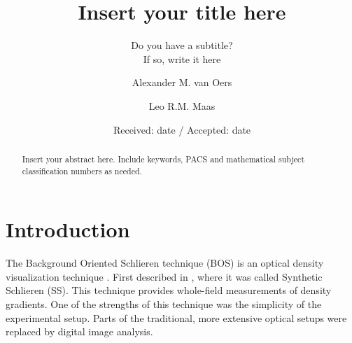 \documentclass[smallextended]{svjour3}       %
\begin{document}
\title{Insert your title here%
}
\subtitle{Do you have a subtitle?\\ If so, write it here}


\author{Alexander M. van Oers \and
       Leo R.M. Maas %
}



\date{Received: date / Accepted: date}


\maketitle

\begin{abstract}
Insert your abstract here. Include keywords, PACS and mathematical
subject classification numbers as needed.
\end{abstract}

\section{Introduction}
\label{intro}
The Background Oriented Schlieren technique (BOS) is an optical density visualization technique \cite{meier2002computerized,raffel2015background}. First described in \cite{dalziel2000whole}, where it was called Synthetic Schlieren (SS). This technique provides whole-field measurements of density gradients. One of the strengths of this technique was the simplicity of the experimental setup. Parts of the traditional, more extensive optical setups were replaced by digital image analysis. 
\end{document}
